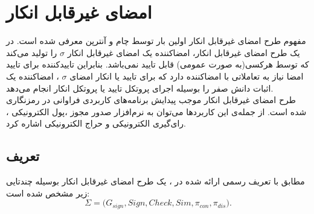 \documentclass[12pt,a4paper]{article}
\date{}
\theoremstyle{plain}
\newtheorem{theorem}{قضیه}
\theoremstyle{definition}
\theoremstyle{remark}
\begin{document}

\newpage
\section{\bf امضای غیرقابل انکار}\label{Undeniable_signature}\cite{undeniable}
مفهوم طرح امضای غیرقابل انکار اولین بار توسط چام و آنترپن
\cite{undeniable_chaum}
معرفی شده است. در یک طرح امضای غیرقابل انکار، امضاکننده یک امضای غیرقابل انکار
$\sigma$
را تولید می‌کند که توسط هرکسی(به صورت عمومی) قابل تایید نمی‌باشد. بنابراین تاییدکننده برای تایید امضا نیاز به تعاملاتی با امضاکننده دارد که برای تایید یا انکار امضای 
$\sigma$
، امضاکننده یک اثبات دانش صفر را بوسیله اجرای پروتکل تایید یا پروتکل انکار انجام می‌دهد.
\\
طرح امضای غیرقابل انکار موجب پیدایش برنامه‌های کاربردی فراوانی در رمزنگاری شده است. از جمله‌ی این کاربردها می‌توان به نرم‌افزار صدور مجوز
،پول الکترونیکی
، رای‌گیری الکترونیکی
و حراج الکترونیکی
اشاره کرد.
\subsection{\bf تعریف}
مطابق با تعریف رسمی ارائه شده در
\cite{convertibleـundeniable}
، یک طرح امضای غیرقابل انکار بوسیله چندتایی زیر مشخص شده است:
$$ \Sigma = \big( G_{sign} , Sign , Check , Sim , \pi_{con} , \pi_{dis} \big). $$
\end{document}
